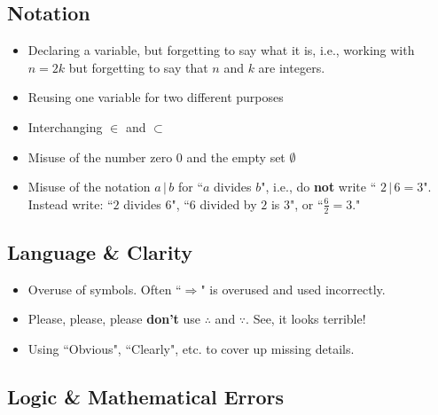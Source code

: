 \documentclass[11pt]{amsart}
\begin{document}
\subsection*{Notation}
\begin{itemize}
	\item Declaring a variable, but forgetting to say what it is, i.e., working with $n = 2k$ but forgetting to say that $n$ and $k$ are integers.
	\item Reusing one variable for two different purposes
	\item Interchanging $\in$ and $\subset$
	\item Misuse of the number zero $0$ and the empty set $\emptyset$
	\item Misuse of the notation $a\, \vert\, b$ for ``$a$ divides $b$", i.e., do \textbf{not} write `` $2 \,\vert\, 6 = 3$".  Instead write: ``$2$ divides $6$",  ``$6$ divided by $2$ is $3$", or ``$\frac{6}{2} = 3$."
\end{itemize}


\subsection*{Language \& Clarity}
\begin{itemize}
	\item Overuse of symbols.  Often ``$\Rightarrow$" is overused and used incorrectly.
	\item Please, please, please \textbf{don't} use $\therefore$ and $\because$.  See, it looks terrible!
	\item Using ``Obvious", ``Clearly", etc. to cover up missing details.
\end{itemize}

\subsection*{Logic \& Mathematical Errors}
\end{document}
